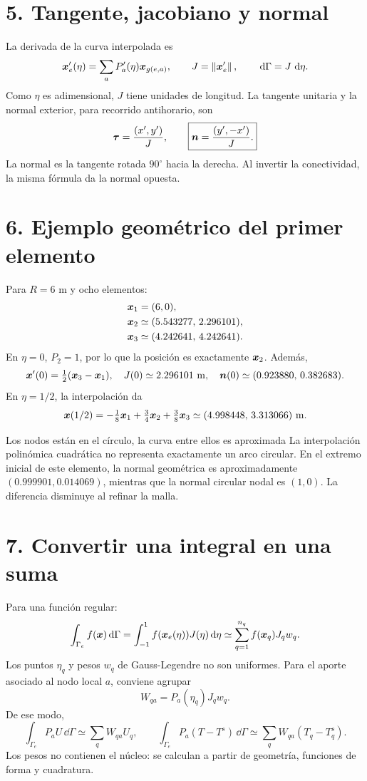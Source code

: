 \documentclass[11pt]{article}
\begin{document}
\newpage
\section*{5. Tangente, jacobiano y normal}
La derivada de la curva interpolada es
\[
 \bm{x}'_e(\eta)=\sum_aP_a'(\eta)\bm{x}_{g(e,a)},\qquad
 J=\left\lVert\bm{x}'_e\right\rVert,\qquad
 \,\mathrm{d}\Gamma=J\,\,\mathrm{d}\eta.
\]
Como \(\eta\) es adimensional, \(J\) tiene unidades de longitud.
La tangente unitaria y la normal exterior, para recorrido antihorario, son
\[
 \bm{\tau}=\frac{(x',y')}{J},\qquad
 \boxed{\bm{n}=\frac{(y',-x')}{J}.}
\]
La normal es la tangente rotada \(90^\circ\) hacia la derecha.
Al invertir la conectividad, la misma fórmula da la normal opuesta.

\section*{6. Ejemplo geométrico del primer elemento}
Para \(R=6\) m y ocho elementos:
\[
\begin{aligned}
 \bm{x}_1&=(6,0),\\
 \bm{x}_2&\simeq(5.543277,\,2.296101),\\
 \bm{x}_3&\simeq(4.242641,\,4.242641).
\end{aligned}
\]
En \(\eta=0\), \(P_2=1\), por lo que la posición es exactamente
\(\bm{x}_2\). Además,
\[
 \bm{x}'(0)=\tfrac12(\bm{x}_3-\bm{x}_1),\quad
 J(0)\simeq2.296101\ \mathrm m,\quad
 \bm{n}(0)\simeq(0.923880,\,0.382683).
\]
En \(\eta=1/2\), la interpolación da
\[
 \bm{x}(1/2)=-\tfrac18\bm{x}_1+\tfrac34\bm{x}_2+\tfrac38\bm{x}_3
 \simeq(4.998448,\,3.313066)\ \mathrm m.
\]

\begin{alerta}{Los nodos están en el círculo, la curva entre ellos es aproximada}
La interpolación polinómica cuadrática no representa exactamente un arco
circular. En el extremo inicial de este elemento, la normal geométrica es
aproximadamente \((0.999901,0.014069)\), mientras que la normal circular
nodal es \((1,0)\). La diferencia disminuye al refinar la malla.
\end{alerta}

\newpage
\section*{7. Convertir una integral en una suma}
Para una función regular:
\[
 \int_{\Gamma_e}f(\bm{x})\,\mathrm{d}\Gamma
 =\int_{-1}^{1}f(\bm{x}_e(\eta))J(\eta)\,\mathrm{d}\eta
 \simeq\sum_{q=1}^{n_q}f(\bm{x}_q)J_qw_q.
\]
Los puntos \(\eta_q\) y pesos \(w_q\) de Gauss-Legendre no son uniformes.
Para el aporte asociado al nodo local \(a\), conviene agrupar
\[
 \boxed{W_{qa}=P_a(\eta_q)J_qw_q.}
\]
De ese modo,
\[
 \int_{\Gamma_e}P_aU\,\dd\Gamma\simeq\sum_qW_{qa}U_q,\qquad
 \int_{\Gamma_e}P_a(T-T^s)\,\dd\Gamma\simeq\sum_qW_{qa}(T_q-T_q^s).
\]
Los pesos no contienen el núcleo: se calculan a partir de geometría,
funciones de forma y cuadratura.
\end{document}
